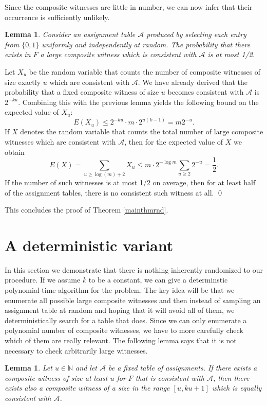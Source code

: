 \documentclass[11pt,a4paper]{article}
\newtheorem{lemma}[theorem]{Lemma}
\begin{document}
Since the composite witnesses are little in number, we can now infer that their occurrence is sufficiently unlikely.

\begin{lemma}
\label{nolargews}
Consider an assignment table $\mathcal{A}$ produced by selecting each entry from $\{0,1\}$
uniformly and independently at random. The probability that there exists in $F$ a large composite
witness which is consistent with $\mathcal{A}$ is at most 1/2.
\end{lemma}

\proof Let $X_u$ be the random variable that counts the number of composite witnesses of size
exactly $u$ which are consistent with $\mathcal{A}$. We have already derived that the probability that a fixed
composite witness of size $u$ becomes consistent with $\mathcal{A}$ is $2^{-ku}$. Combining this with
the previous lemma yields the following bound on the expected value of $X_u$:
$$ E(X_u) \le 2^{-ku} \cdot m \cdot 2^{u(k-1)} = m 2^{-u}. $$
If $X$ denotes the random variable that counts the total number of large composite witnesses which are 
consistent with $\mathcal{A}$, then for the expected value of $X$ we obtain
$$ E(X) = \sum_{u \ge \log(m)+2} X_u \le m \cdot 2^{-\log m} \sum_{u \ge 2} 2^{-u} = \frac{1}{2}. $$
If the number of such witnesses is at most 1/2 on average, then for at least half of the assignment tables,
there is no consistent such witness at all.  \qed

This concludes the proof of Theorem \ref{mainthmrnd}.

\section{A deterministic variant}

In this section we demonstrate that there is nothing inherently randomized to our procedure. If we assume $k$ to be
a constant, we can give a determinstic polynomial-time algorithm for the problem. The key idea will be that we enumerate
all possible large composite witnesses and then instead of sampling an assignment table at random and hoping that it will avoid
all of them, we deterministically search for a table that does. Since we can only enumerate a polynomial number of
composite witnesses, we have to more carefully check which of them are really relevant. The following lemma says that it
is not necessary to check arbitrarily large witnesses.

\begin{lemma}
\label{lemsubwitnesses}
Let $u \in \mathbb{N}$ and let $\mathcal{A}$ be a fixed table of assignments. If there exists a composite witness of size
at least $u$ for $F$ that is consistent with $\mathcal{A}$, then there exists also a composite witness of a size in the
range $[u,ku+1]$ which is equally consistent with $\mathcal{A}$.
\end{lemma}
\end{document}
